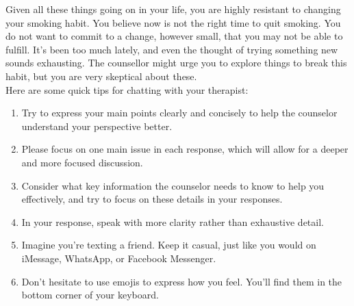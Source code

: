 \begin{tcolorbox}
Given all these things going on in your life, you are highly resistant to changing your smoking habit. You believe now is not the right time to quit smoking. You do not want to commit to a change, however small, that you may not be able to fulfill. It's been too much lately, and even the thought of trying something new sounds exhausting. The counsellor might urge you to explore things to break this habit, but you are very skeptical about these.\\
Here are some quick tips for chatting with your therapist:
\vspace{-5pt}\begin{enumerate}[itemsep=0pt, parsep=0pt]
    \item Try to express your main points clearly and concisely to help the counselor understand your perspective better.
    \item Please focus on one main issue in each response, which will allow for a deeper and more focused discussion.
    \item Consider what key information the counselor needs to know to help you effectively, and try to focus on these details in your responses.
    \item In your response, speak with more clarity rather than exhaustive detail.
    \item Imagine you're texting a friend. Keep it casual, just like you would on iMessage, WhatsApp, or Facebook Messenger.
    \item Don't hesitate to use emojis to express how you feel. You'll find them in the bottom corner of your keyboard.
\end{enumerate}




\end{tcolorbox}
